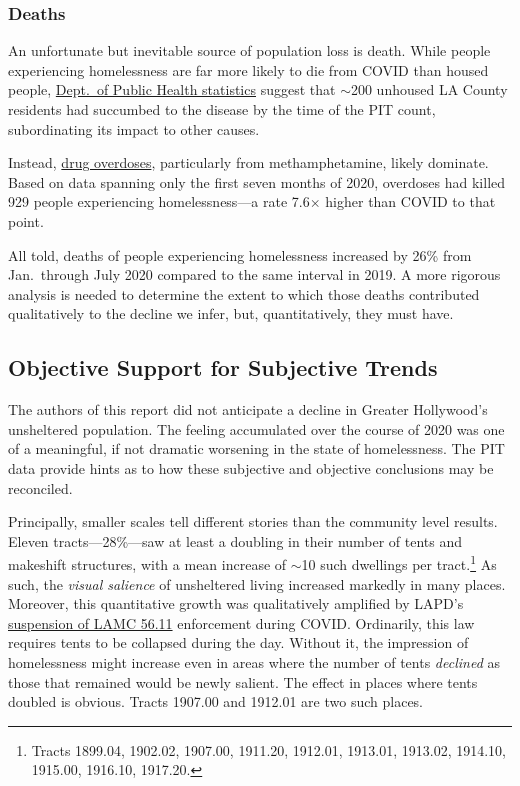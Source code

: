 \documentclass[11pt,twocolumn]{article}
\begin{document}
\subsubsection{Deaths}

An unfortunate but inevitable source of population loss is death. While people experiencing homelessness are far more 
likely to die from COVID than housed people, \href{http://publichealth.lacounty.gov/media/coronavirus/docs/SummaryReport_People_Experiencing_Homelessness.pdf}
{Dept.\ of Public Health statistics} suggest that $\sim$200 unhoused LA County residents had succumbed to the 
disease by the time of the PIT count, subordinating its impact to other causes.

Instead, \href{http://publichealth.lacounty.gov/chie/reports/HomelessMortality2020_CHIEBrief_Final.pdf}{drug overdoses},
particularly from methamphetamine, likely dominate. Based on data spanning only the first seven months of 2020, overdoses had
killed 929 people experiencing homelessness---a rate 7.6$\times$ higher than COVID to that point.

All told, deaths of people experiencing homelessness increased by 26\% from Jan.\ through July 2020 compared to 
the same interval in 2019. A more rigorous analysis is needed to determine the extent to which those deaths contributed 
qualitatively to the decline we infer, but, quantitatively, they must have.

\subsection{Objective Support for Subjective Trends}

The authors of this report did not anticipate a decline in Greater Hollywood's unsheltered population.
The feeling accumulated over the course of 2020 was one of a meaningful, if not dramatic worsening in the
state of homelessness. The PIT data provide hints as to how these subjective and objective conclusions may be
reconciled.

Principally, smaller scales tell different stories than the community level results. Eleven tracts---28\%---saw at 
least a doubling in their number of tents and makeshift structures, with a mean increase of $\sim$10 such dwellings
per tract.\footnote{Tracts 1899.04, 1902.02, 1907.00, 1911.20, 1912.01, 1913.01, 1913.02, 1914.10, 1915.00,
1916.10, 1917.20.} As such, the {\it visual salience} of unsheltered living increased markedly in many places. Moreover,
this quantitative growth was qualitatively amplified by LAPD's \href{https://clkrep.lacity.org/onlinedocs/2020/20-0147_misc_3-17-20_p.pdf}{suspension of LAMC 56.11} enforcement during COVID. 
Ordinarily, this law requires tents to be collapsed during the day. Without it, the impression of homelessness might 
increase even in areas where the number of tents {\it declined} as those that remained would be newly salient.
The effect in places where tents doubled is obvious. Tracts 1907.00 and 1912.01 are two such places.
\end{document}

